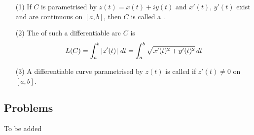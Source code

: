 \vspace*{1em}

\begin{definition}\hfill
\begin{itemize}
\item[(1)] If $C$ is parametrised by $z(t) = x(t) + iy(t)$ and $x'(t),\,y'(t)$ exist and are continuous on $[a,b]$, then $C$ is called a .
\item[(2)] The  of such a differentiable arc $C$ is
\[L(C) = \int_a^b \left\lvert z'(t)\right\rvert\,dt = \int_a^b\sqrt{x'(t)^2 + y'(t)^2}\,dt\]
\item[(3)] A differentiable curve parametrised by $z(t)$ is called  if $z'(t) \neq 0$ on $[a,b]$.
\end{itemize}
\end{definition}

\vspace*{2em}

\subsection{Problems}
\vspace{0.1in}
To be added
%
